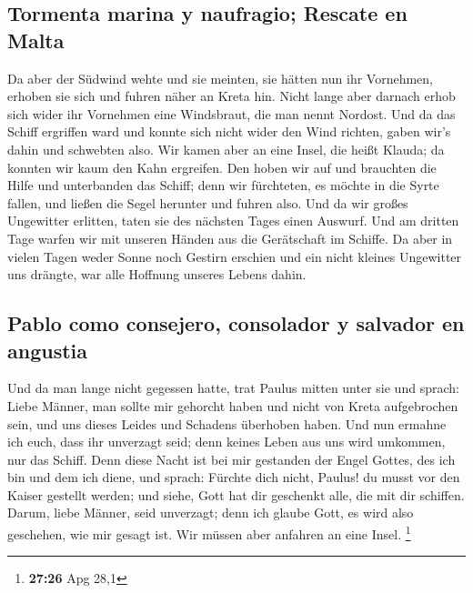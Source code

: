 \hypertarget{tormenta-marina-y-naufragio-rescate-en-malta}{%
\subsection{Tormenta marina y naufragio; Rescate en
Malta}\label{tormenta-marina-y-naufragio-rescate-en-malta}}

 Da aber der Südwind wehte und sie meinten, sie hätten
nun ihr Vornehmen, erhoben sie sich und fuhren näher an Kreta hin.
 Nicht lange aber darnach erhob sich wider ihr Vornehmen
eine Windsbraut, die man nennt Nordost.  Und da das
Schiff ergriffen ward und konnte sich nicht wider den Wind richten,
gaben wir's dahin und schwebten also.  Wir kamen aber an
eine Insel, die heißt Klauda; da konnten wir kaum den Kahn ergreifen.
 Den hoben wir auf und brauchten die Hilfe und
unterbanden das Schiff; denn wir fürchteten, es möchte in die Syrte
fallen, und ließen die Segel herunter und fuhren also. 
Und da wir großes Ungewitter erlitten, taten sie des nächsten Tages
einen Auswurf.  Und am dritten Tage warfen wir mit
unseren Händen aus die Gerätschaft im Schiffe.  Da aber
in vielen Tagen weder Sonne noch Gestirn erschien und ein nicht kleines
Ungewitter uns drängte, war alle Hoffnung unseres Lebens dahin.

\hypertarget{pablo-como-consejero-consolador-y-salvador-en-angustia}{%
\subsection{Pablo como consejero, consolador y salvador en
angustia}\label{pablo-como-consejero-consolador-y-salvador-en-angustia}}

 Und da man lange nicht gegessen hatte, trat Paulus
mitten unter sie und sprach: Liebe Männer, man sollte mir gehorcht haben
und nicht von Kreta aufgebrochen sein, und uns dieses Leides und
Schadens überhoben haben.  Und nun ermahne ich euch, dass
ihr unverzagt seid; denn keines Leben aus uns wird umkommen, nur das
Schiff.  Denn diese Nacht ist bei mir gestanden der Engel
Gottes, des ich bin und dem ich diene,  und sprach:
Fürchte dich nicht, Paulus! du musst vor den Kaiser gestellt werden; und
siehe, Gott hat dir geschenkt alle, die mit dir schiffen.
 Darum, liebe Männer, seid unverzagt; denn ich glaube
Gott, es wird also geschehen, wie mir gesagt ist.  Wir
müssen aber anfahren an eine Insel. \footnote{\textbf{27:26} Apg 28,1}


